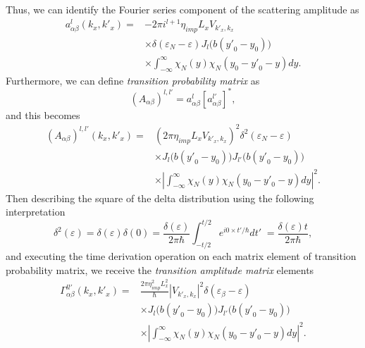 \documentclass[
 reprint,
 amsmath,amssymb,
 aps,
 prb,
]{revtex4-2}
\begin{document}
Thus, we can identify the Fourier series component of the scattering amplitude as
\begin{equation} \label{eq:c36}
  \begin{aligned}
    a^l_{\alpha\beta}(k_x,k'_x) = &
    -2\pi i^{l+1}
    \eta_{imp} L_x V_{{k'}_x,k_x}\\
    & \times
    \delta(\varepsilon_{N} - \varepsilon)
    J_l\bm{(}b({y'}_0 - y_0)\bm{)}\\
    & \times
    \int_{-\infty}^{\infty}
    {\chi}_N(y)
    {\chi}_N(y_0 - {y'}_0 - y) dy.
  \end{aligned}
\end{equation}
Furthermore, we can define \textit{transition probability matrix} as
\begin{equation} \label{eq:c37}
    \left(A_{\alpha\beta} \right)^{l,l'} =
    a^l_{\alpha\beta}\left[a^{l'}_{\alpha\beta} \right]^{*},
\end{equation}
and this becomes
\begin{equation} \label{eq:c38}
  \begin{aligned}
      \left(A_{\alpha\beta} \right)^{l,l'}(k_x,k'_x) = &
      \left({ 2 \pi \eta_{imp} L_x V_{{k'}_x,k_x}}\right)^2
      \delta^2(\varepsilon_{N} - \varepsilon) \\
      & \times
      J_l\bm{(}b({y'}_0 - y_0)\bm{)} J_{l'}\bm{(}b({y'}_0 - y_0)\bm{)}\\
      & \times
      \left|
      \int_{-\infty}^{\infty}
      {\chi}_N(y)
      {\chi}_N(y_0 - {y'}_0 - y) dy \right|^2.
  \end{aligned}
\end{equation}
Then describing the square of the delta distribution using the following interpretation \cite{dini16,kibis14}
\begin{equation} \label{eq:c39}
    \delta^2(\varepsilon) =
    \delta(\varepsilon)\delta(0) =
    \frac{\delta(\varepsilon)}{2\pi \hbar}
    \int_{-t/2}^{t/2} e^{i0\times t'/\hbar} dt'\; =
    \frac{\delta(\varepsilon)t}{2\pi \hbar},
\end{equation}
and executing the time derivation operation on each matrix element of transition probability matrix, we receive the \textit{transition amplitude matrix} elements
\begin{equation} \label{eq:40}
  \begin{aligned}
    \Gamma_{\alpha\beta}^{ll'}(k_x,k'_x) = &
    \frac { 2\pi \eta_{imp}^2 L_x^2}{ \hbar} |V_{{k'}_x,k_x}|^2
    \delta(\varepsilon_{\beta} - \varepsilon)\\
    & \times
    J_l\bm{(}b({y'}_0 - y_0)\bm{)} J_{l'}\bm{(}b({y'}_0 - y_0)\bm{)} \\
    & \times
    \left|
    \int_{-\infty}^{\infty}
    {\chi}_N(y)
    {\chi}_N(y_0 - {y'}_0 - y) dy \right|^2.
  \end{aligned}
\end{equation}
\end{document}
